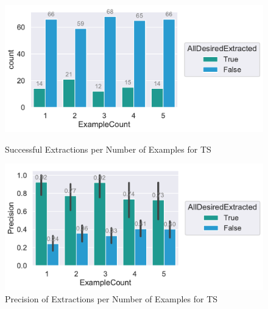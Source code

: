 \documentclass[\myrootdir/main.tex]{subfiles}
\begin{document}
\begin{figure}[htbp]
	\centering
	\begin{minipage}{0.45\textwidth}
		\centering
		\includegraphics[width=\textwidth, clip]{img/big-study/success-examples-ir.pdf}
		\caption{Successful Extractions per Number of Examples for TS}
		\label{fig:success-examples-ir}
	\end{minipage}\hfill
	\begin{minipage}{0.45\textwidth}
		\centering
		\includegraphics[width=\textwidth, clip]{img/big-study/precision-ir.pdf}
		\caption{Precision of Extractions per Number of Examples for TS}
		\label{fig:precision-ir}
	\end{minipage}
\end{figure}
\end{document}
